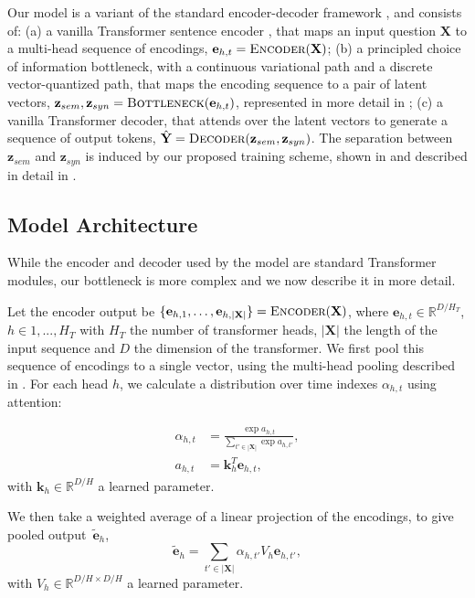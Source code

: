 \documentclass[11pt,a4paper]{article}
\begin{document}
Our model is a variant of the standard encoder-decoder framework
\cite{Cho2014a}, and consists of: (a) a vanilla Transformer sentence
encoder \cite{Vaswani2017}, that maps an input question $\textbf{X}$
to a multi-head sequence of encodings, $\textbf{e}_{h,t} =
\textsc{Encoder}(\textbf{X})$; (b) a principled choice of information
bottleneck, with a continuous variational path and a discrete vector-quantized
path, that maps the encoding sequence to a pair of latent vectors,
$\textbf{z}_{sem}, \textbf{z}_{syn} =
\textsc{Bottleneck}(\textbf{e}_{h,t})$, represented in more detail in
; (c) a vanilla Transformer decoder, that attends
over the latent vectors to generate a sequence of output tokens,
$\hat{\textbf{Y}} = \textsc{Decoder}(\textbf{z}_{sem},
\textbf{z}_{syn})$. The separation between $\textbf{z}_{sem}$ and
$\textbf{z}_{syn}$ is induced by our proposed training scheme, shown
in  and described in detail in .

\subsection{Model Architecture}
\label{sec:bottleneck}

While the encoder and decoder used by the model are standard
Transformer modules, our bottleneck is more complex and we now describe it in more detail.

Let the encoder output be $\{\textbf{e}_{h,1}, \ldots,
\textbf{e}_{h,|\textbf{X}|}\} = \textsc{Encoder}(\textbf{X})$, where
$\textbf{e}_{h,t} \in \mathbb{R}^{D/H_T}$, $h \in {1,
..., H_T}$ with $H_T$
the number of transformer heads, $|\textbf{X}|$ the length of the
input sequence and $D$ the dimension of the transformer. We first pool
this sequence of encodings to a single vector, using the multi-head
pooling described in . For each
head $h$, we calculate a distribution over time indexes $\alpha_{h,t}$
using attention:

\begin{align}
    \alpha_{h,t} &= \frac{\exp{a_{h,t}}}{\sum_{t' \in |\textbf{X}|} \exp{a_{{h,t'}}}}, \\ 
    a_{h,t} &= \textbf{k}_{h}^T  \textbf{e}_{h,t},
\end{align}
with $\textbf{k}_{h} \in \mathbb{R}^{D/H}$ a learned parameter. 

We then take a weighted average of a linear projection of the
encodings, to give pooled output~$\tilde{\textbf{e}}_h$,
\begin{equation}
    \tilde{\textbf{e}}_h = \sum_{t' \in |\textbf{X}|} \alpha_{h,t'} V_h \textbf{e}_{h,t'},
\end{equation}
with $V_{h} \in \mathbb{R}^{D/H \times D/H}$ a learned parameter.
\end{document}
